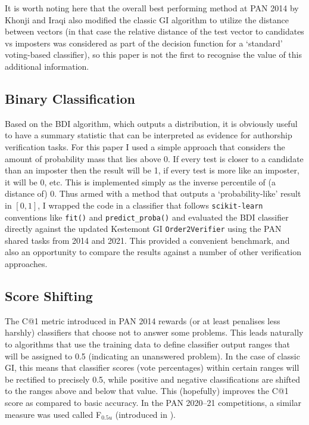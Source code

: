 \documentclass[
    hf
]{ceurart}
\begin{document}
It is worth noting here that the overall best performing method at PAN 2014 by Khonji and Iraqi
\cite{khonji_iraqi} also modified the classic GI algorithm to utilize the distance between vectors
(in that case the relative distance of the test vector to candidates vs imposters was considered as
part of the decision function for a `standard' voting-based classifier), so this paper is not the
first to recognise the value of this additional information.

\subsection{Binary Classification}

Based on the BDI algorithm, which outputs a distribution, it is obviously useful to have a summary
statistic that can be interpreted as evidence for authorship verification tasks. For this paper I
used a simple approach that considers the amount of probability mass that lies above 0. If every
test is closer to a candidate than an imposter then the result will be 1, if every test is more like
an imposter, it will be 0, etc. This is implemented simply as the inverse percentile of (a distance
of) 0. Thus armed with a method that outputs a `probability-like' result in $[0,1]$, I wrapped the
code in a classifier that follows \texttt{scikit-learn} \cite{scikit-learn} conventions like
\texttt{fit()} and \texttt{predict\_proba()} and evaluated the BDI classifier directly against the
updated Kestemont GI \texttt{Order2Verifier} using the PAN shared tasks from 2014 and 2021. This
provided a convenient benchmark, and also an opportunity to compare the results against a number of
other verification approaches.

\subsection{Score Shifting}

The C@1 metric introduced in PAN 2014 rewards (or at least penalises less harshly) classifiers that
choose not to answer some problems. This leads naturally to algorithms that use the training data to
define classifier output ranges that will be assigned to 0.5 (indicating an unanswered problem). In
the case of classic GI, this means that classifier scores (vote percentages) within certain ranges
will be rectified to precisely 0.5, while positive and negative classifications are shifted to the
ranges above and below that value. This (hopefully) improves the C@1 score as compared to basic
accuracy. In the PAN 2020--21 competitions, a similar measure was used called F$_{0.5u}$ (introduced
in \cite{bevendorff-etal-2019-generalizing}).
\end{document}

